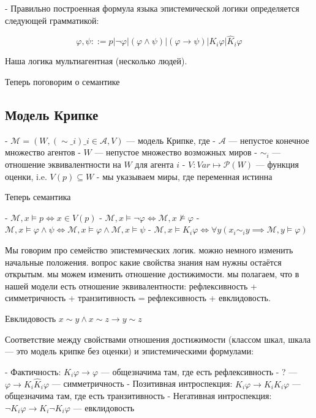 \documentclass[openany]{book}
\theoremstyle{plain}
\theoremstyle{definition}
\begin{document}
- Правильно построенная формула языка эпистемической логики определяется следующей грамматикой:

$$ \varphi, \psi ::= p | \neg \varphi | (\varphi \land \psi) | (\varphi \to \psi) | K_i\varphi | \hat{K}_i \varphi$$

Наша логика мультиагентная (несколько людей).

Теперь поговорим о семантике

\subsection{ Модель Крипке }

- \(\mathcal{M} = (W, (\sim\_i)\_{i\in \mathcal{A}}, V)\) — модель Крипке, где
- \(\mathcal{A}\) — непустое конечное множество агентов 
- \(W\) — непустое множество возможных миров
- \(\sim_i\) — отношение эквивалентности на \(W\) для агента \(i\)
- \(V : Var \mapsto \mathcal{P}(W)\) — функция оценки, i.e. \(V(p) \subseteq W\)
    - мы указываем миры, где переменная истинна

Теперь семантика

- \(\mathcal{M}, x \models p \Leftrightarrow x \in V(p)\) 
- \(\mathcal{M}, x \models \neg \varphi \Leftrightarrow \mathcal{M}, x \not\models \varphi\) 
- \(\mathcal{M}, x \models \varphi \land \psi \Leftrightarrow \mathcal{M}, x \models \varphi \land \mathcal{M}, x \models \psi\)
- \(\mathcal{M}, x \models K_i \varphi \Leftrightarrow \forall y(x_i \sim_i y \implies \mathcal{M}, y \models \varphi)\)

Мы говорим про семейство эпистемических логик. можно немного изменить начальные положения.
вопрос какие свойства знания нам нужны остаётся открытым. мы можем изменить отношение достижимости. мы полагаем, что в нашей модели есть отношение эквивалентности: рефлексивность + симметричность + транзитивность = рефлексивность + евклидовость.

Евклидовость \(x \sim y \land x \sim z \to y \sim z\)

Соответствие между свойствами отношения достижимости (классом шкал, шкала — это модель крипке без оценки) и эпистемическими формулами:

- Фактичность: \(K_i \varphi \to \varphi\) — общезначима там, где есть рефлексивность
- ? — \(\varphi \to K_i \hat{K}_i \varphi\) — симметричность
- Позитивная интроспекция: \(K_i \varphi \to K_i K_i \varphi\) — общезначима там, где есть транзитивность
- Негативная интроспекция: \(\neg K_i \varphi \to K_i \neg K_i \varphi\) — евклидовость
\end{document}
